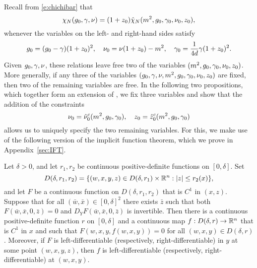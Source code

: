 Recall from \eqref{e:chichibar} that
\begin{equation}
\label{e:chichihat}
\chi_N(g_0, \gamma, \nu)
	=
(1 + z_0) \hat\chi_N(m^2, g_0, \gamma_0, \nu_0, z_0),
\end{equation}
whenever the variables on the left- and right-hand sides satisfy
\begin{equation}
\label{e:gg0-re}
g_0 = (g_0 - \gamma) (1 + z_0)^2,
\quad
\nu_0 = \nu (1 + z_0) - m^2,
\quad
\gamma_0 = \frac{1}{4d} \gamma (1 + z_0)^2.
\end{equation}
Given $g_0,\gamma,\nu$,
these relations leave free two of the variables
$(m^2, g_0, \gamma_0, \nu_0, z_0)$.
More generally, if any three of the variables
$(g_0, \gamma, \nu, m^2, g_0, \gamma_0, \nu_0, z_0)$
are fixed, then two of the remaining variables are free.
In the following two propositions,
which together form an extension of \cite[Proposition~\ref{log-prop:changevariables}]{BBS-saw4-log},
we fix three variables and show that the addition of the constraints
\begin{equation}
\label{e:crit-constraint}
\nu_0 = \hat \nu_0^c(m^2, g_0, \gamma_0),
	\quad
z_0   = \hat z_0^c(m^2, g_0, \gamma_0)
\end{equation}
allows us to uniquely specify the two remaining variables.
For this, we make use of the following version of the
implicit function theorem, which we prove in Appendix~\ref{sec:IFT}.

\begin{prop}
\label{prop:IFT}
Let $\delta > 0$, and let $r_1, r_2$ be continuous positive-definite functions on $[0, \delta]$.
Set
\begin{equation}
		D(\delta, r_1, r_2)
		=
		\{ (w, x, y, z) \in D(\delta, r_1) \times {\mathbb R}^n : |z| \leq r_2(x) \},
\end{equation}
and let $F$ be a continuous function on $D(\delta, r_1, r_2)$ that is $C^1$ in $(x, z)$.
Suppose that for all $(\bar w, \bar x) \in [0, \delta]^2$ there exists $\bar z$
such that both $F(\bar w, \bar x, 0, \bar z) = 0$
and $D_Y F(\bar w, \bar x, 0, \bar z)$ is invertible.
Then there is a continuous positive-definite function $r$ on $[0, \delta]$ and
a continuous map $f : D(\delta, r) \rightarrow {\mathbb R}^n$
that is $C^1$ in $x$
and such that $F(w, x, y, f(w, x, y)) = 0$
for all $(w, x, y) \in D(\delta, r)$.
Moreover, if $F$ is left-differentiable
(respectively, right-differentiable) in $y$ at some point $(w, x, y, z)$,
then $f$ is left-differentiable (respectively, right-differentiable) at $(w, x, y)$.
\end{prop}

